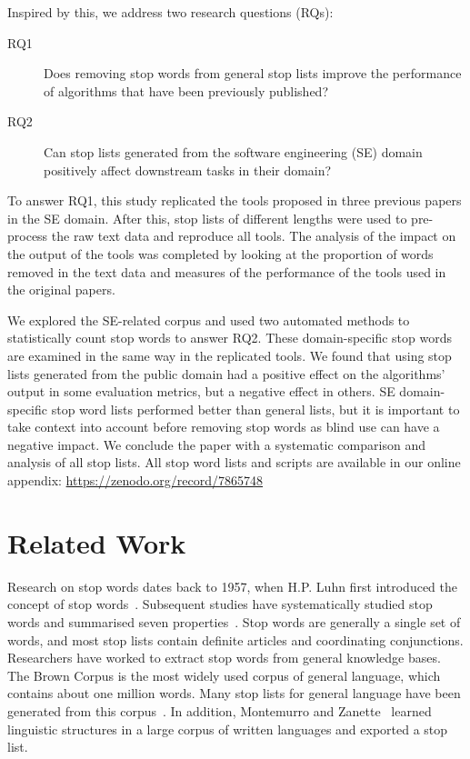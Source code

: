 \documentclass[conference]{IEEEtran}
\begin{document}
\begin{sloppy}
Inspired by this, we address two research questions (RQs): 
 
\begin{description}
\item[RQ1] Does removing stop words from general stop lists improve the performance of algorithms that have been previously published?
\item[RQ2] Can stop lists generated from the software engineering (SE) domain positively affect downstream tasks in their domain?
\end{description}
 
To answer RQ1, this study replicated the tools proposed in three previous papers in the SE domain. After this, stop lists of different lengths were used to pre-process the raw text data and reproduce all tools. The analysis of the impact on the output of the tools was completed by looking at the proportion of words removed in the text data and measures of the performance of the tools used in the original papers. 
 
We explored the SE-related corpus and used two automated methods to statistically count stop words to answer RQ2. These domain-specific stop words are examined in the same way in the replicated tools. We found that using stop lists generated from the public domain had a positive effect on the algorithms' output in some evaluation metrics, but a negative effect in others. SE domain-specific stop word lists performed better than general lists, but it is important to take context into account before removing stop words as blind use can have a negative impact. We conclude the paper with a systematic comparison and analysis of all stop lists. All stop word lists and scripts are available in our online appendix: \url{https://zenodo.org/record/7865748}

\section{Related Work}

Research on stop words dates back to 1957, when H.P. Luhn first introduced the concept of stop words~\cite{luhn1957statistical}. Subsequent studies have systematically studied stop words and summarised seven properties~\cite{kaur2018stopwords}. Stop words are generally a single set of words, and most stop lists contain definite articles and coordinating conjunctions. Researchers have worked to extract stop words from general knowledge bases. The Brown Corpus is the most widely used corpus of general language, which contains about one million words. Many stop lists for general language have been generated from this corpus~\cite{fox1989stop, maverick1969computational}. In addition, Montemurro and Zanette~\cite{montemurro2010towards} learned linguistic structures in a large corpus of written languages and exported a stop list. 
 

\end{sloppy}
\end{document}
